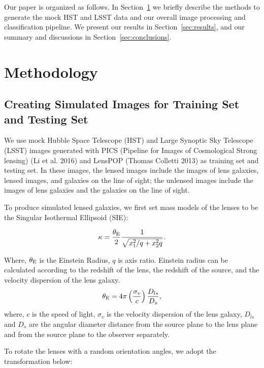 \documentclass{emulateapj}
\begin{document}
Our paper is organized as follows. In Section~\ref{sec:methods} we
briefly describe the methods to generate the mock HST and LSST data
and our overall image processing and classification pipeline. We
present our results in Section~\ref{sec:results}, and our summary and
discussions in Section~\ref{sec:conclusions}.

\section{Methodology}
\label{sec:methods}
\subsection{Creating Simulated Images for Training Set and Testing Set}

We use mock Hubble Space Telescope (HST) and Large Synoptic Sky
Telescope (LSST) images generated with PICS (Pipeline for Images of
Cosmological Strong lensing) (Li et al. 2016) and LensPOP (Thomas
Colletti 2013) as training set and testing set. In these images, the
lensed images include the images of lens galaxies, lensed images, and
galaxies on the line of sight; the unlensed images include the images
of lens galaxies and the galaxies on the line of sight.

To produce simulated lensed galaxies, we first set mass models of the
lenses to be the Singular Isothermal Ellipsoid (SIE):

\begin{equation}
\kappa = \frac{\theta_{\rm E}}{2}\frac{1}{\sqrt{x_1^2/q+x_2^2 q}}.
\end{equation}


Where, $\theta_{\rm E}$ is the Einstein Radius, $q$ is axis
ratio. Einstein radius can be calculated according to the redshift of
the lens, the redshift of the source, and the velocity dispersion of
the lens galaxy.
\begin{equation}
\theta_{\rm E} = 4\pi\left(\frac{\sigma_v}{c}\right)\frac{D_{ls}}{D_{s}}, 
\end{equation}
where, $c$ is the speed of light, $\sigma_v$ is the velocity
dispersion of the lens galaxy, $D_{ls}$ and $D_{s}$ are the angular
diameter distance from the source plane to the lens plane and from the
source plane to the observer separately.

To rotate the lenses with a random orientation angles, we adopt the
transformation below:
\end{document}
